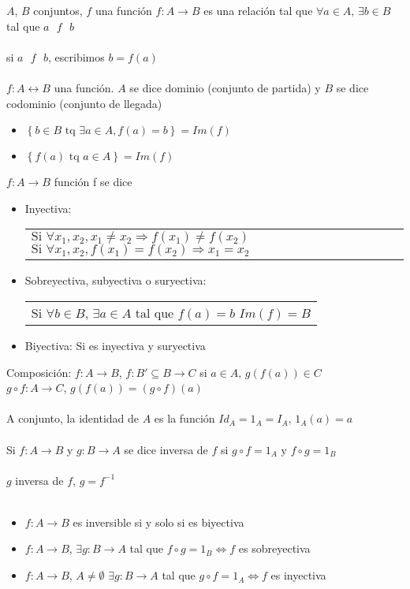 \documentclass[a4paper,10pt]{article}
\begin{document}
 $A$, $B$ conjuntos, $f$ una función $f:A \longrightarrow B$ es una relación tal que $\forall a \in A \mbox{, } \exists b \in B$ tal que $a \mbox{ } f \mbox{ } b$ \\ \\
\notacion si $a \mbox{ } f \mbox{ } b$, escribimos $b = f(a)$ \\ \\
 $f: A \longleftrightarrow B$ una función. $A$ se dice dominio (conjunto de partida) y $B$ se dice codominio (conjunto de llegada)
\begin{itemize}
	\item $\left\{ b \in B \mbox{ tq } \exists a \in A, f(a) = b \right\} = Im(f)$
	\item $\left\{ f(a) \mbox{ tq } a \in A \right \} = Im(f) $
\end{itemize}
 $f:A \longrightarrow B$ función f se dice
\begin{itemize}
	\item Inyectiva: 
		\begin{tabular}{l}
			$\mbox{Si } \forall x_1,x_2,x_1 \not = x_2 \Rightarrow f(x_1) \not = f(x_2)$
			\cr $\mbox{Si } \forall x_1,x_2, f(x_1) = f(x_2) \Rightarrow x_1 = x_2$
		\end{tabular}
	\item Sobreyectiva, subyectiva o suryectiva: 
		\begin{tabular}{l}
			$\mbox{Si } \forall b \in B \mbox{, } \exists a \in A \mbox{ tal que } f(a) = b$
			\cr $Im(f) = B$
		\end{tabular}
	\item Biyectiva: Si es inyectiva y suryectiva
\end{itemize}
 Composición: $f:A \longrightarrow B$, $f:B' \subseteq B \longrightarrow C$ si $a \in A \mbox{, } g \left(f\left(a\right)\right) \in C$ \\ $g \circ f: A \longrightarrow C$, $g \left(f\left(a\right)\right) = \left(g \circ f \right)(a)$ \\ \\
 A conjunto, la identidad de $A$ es la función $Id_{A} = 1_{A} = I_{A} \mbox{, } 1_{A}(a) = a$ \\ \\
 Si $f:A \longrightarrow B$ y $g:B \longrightarrow A$ se dice inversa de $f$ si $g \circ f = 1_{A} \mbox{ y } f \circ g = 1_{B}$ \\ \\
\notacion $g$ inversa de $f$, $g = f^{-1}$ \\ \\
\propiedades 
\begin{itemize}
	\item $f:A \longrightarrow B$ es inversible si y solo si es biyectiva
	\item $f:A \longrightarrow B$, $\exists g:B \longrightarrow A$ tal que $f \circ g = 1_{B} \Leftrightarrow f$ es sobreyectiva
	\item $f:A \longrightarrow B$, $A \not = \emptyset$ $\exists g:B \longrightarrow A$ tal que $g \circ f = 1_{A}  \Leftrightarrow f$ es inyectiva
\end{itemize}
\clearpage
\end{document}

